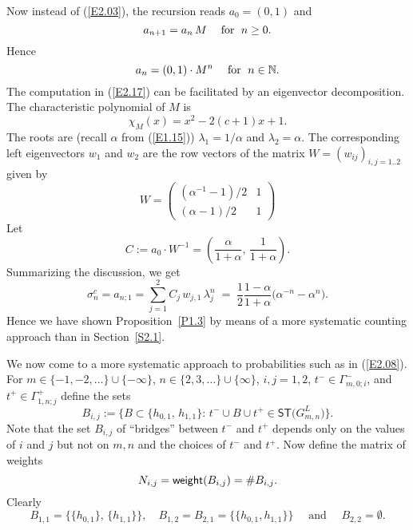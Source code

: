 \documentclass[11pt]{article}
\providecommand{\1}{\mathBB{1}}
\newcommand{\mbu}{\quad\mbox{ and }\quad}
\newcommand{\mf}{\quad\mbox{\;for \;}}
\newcommand{\N}{{\mathbb{N}}}
\newcommand{\equ}[1]{(\ref{#1})}
\def\SPT{\mathsf{ST}}
\newcommand{\weight}{\mathop{\mbox{\sf weight}}}
\begin{document}
Now instead of \equ{E2.03}, the recursion reads
$a_0=(0,1)$ and
\begin{equation}
\label{E2.16}
a_{n+1}=a_n\,M\mf n\geq0.
\end{equation}
Hence
\begin{equation}
\label{E2.17}
a_n=(0,1)\cdot M^{n}\mf n\in\N.
\end{equation}
The computation in \equ{E2.17} can be facilitated by an eigenvector decomposition. The characteristic polynomial of $M$ is
\begin{equation}
\label{E2.18}
\chi_M(x)=x^2-2(c+1)x+1.
\end{equation}
The roots are (recall $\alpha$ from \equ{E1.15})
$\lambda_1=1/\alpha$ and $\lambda_2=\alpha$.
The corresponding left eigenvectors $w_1$ and $w_2$ are the row vectors of the matrix $W=(w_{ij})_{i,j=1..2}$ given by
\begin{equation}
\label{E2.19}
W=\left(\begin{array}{cc}
(\alpha^{-1}-1)/2&1\\
(\alpha-1)/2&1
\end{array}\right)
\end{equation}
Let
\begin{equation}\label{E2.20}
C:=a_0\cdot W^{-1}
=\left(\frac{\alpha}{1+\alpha},\,\frac{1}{1+\alpha}\right).
\end{equation}
Summarizing the discussion, we get \begin{equation}
\label{E2.21}
\sigma^c_n=a_{n;1}
=\sum_{j=1}^2C_j\,w_{j,1}\,\lambda_j^{n}\;=\;\frac12\frac{1-\alpha}{1+\alpha}\big(\alpha^{-n}-\alpha^{n}\big).
\end{equation}
Hence we have shown Proposition~\ref{P1.3} by means of a more systematic counting approach than in Section~\ref{S2.1}.


We now come to a more systematic approach to probabilities such as in \equ{E2.08}.
For $m\in\{-1,-2,\ldots\}\cup\{-\infty\}$, $n\in\{2,3,\ldots\}\cup\{\infty\}$, $i,j=1,2$,  $t^-\in\Gamma^-_{m,0;i}$, and $t^+\in\Gamma^+_{1,n;j}$ define the sets
$$B_{i,j}:=\Big\{B\subset \big\{h_{0,1},\,h_{1,1}\big\}:\,t^-\cup B\cup t^+\in\SPT\big(G^L_{m,n}\big)\Big\}.
$$
Note that the set $B_{i,j}$ of ``bridges'' between $t^-$ and $t^+$ depends only on the values of $i$ and $j$ but not on $m,n$ and the choices of $t^-$ and $t^+$. Now define the matrix of weights
$$N_{i,j}=\weight(B_{i,j})=\#B_{i,j}.$$
Clearly
$$
B_{1,1}=\big\{\{h_{0,1}\},\,\{h_{1,1}\}\big\},\quad
B_{1,2}=B_{2,1}=\big\{\{h_{0,1},h_{1,1}\}\big\}\mbu
B_{2,2}=\emptyset.
$$
\end{document}
